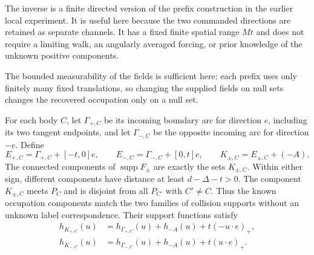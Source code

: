 The inverse is a finite directed version of the prefix construction
in the earlier local experiment.  It is useful here because the
two commanded directions are retained as separate channels.
It has a fixed finite spatial range $Mt$ and does not require a
limiting walk, an angularly averaged forcing, or prior knowledge of
the unknown positive components.

The bounded measurability of the fields is sufficient here: each
prefix uses only finitely many fixed translations, so changing
the supplied fields on null sets changes the recovered occupation
only on a null set.

\begin{lemma}
\label{lem:two-field-supports}
For each body $C$, let $\Gamma_{+,C}$ be its incoming boundary arc
for direction $e$, including its two tangent endpoints, and let
$\Gamma_{-,C}$ be the opposite incoming arc for direction $-e$.
Define
\begin{equation}\label{eq:two-field-strips}
 E_{+,C}=\Gamma_{+,C}+[-t,0]e,\qquad
 E_{-,C}=\Gamma_{-,C}+[0,t]e,
 \qquad K_{\pm,C}=E_{\pm,C}+(-A).
\end{equation}
The connected components of $\operatorname{supp}F_\pm$ are exactly
the sets $K_{\pm,C}$.  Within either sign, different components
have distance at least $d-\Delta-t>0$.
The component $K_{\pm,C}$ meets $P_C$ and is disjoint from all
$P_{C'}$ with $C'\ne C$.  Thus the known occupation components
match the two families of collision supports without an unknown
label correspondence.  Their support functions satisfy
\begin{align}
 h_{K_{+,C}}(u)
   &=h_{\Gamma_{+,C}}(u)+h_{-A}(u)+t(-u\cdot e)_+,
       \label{eq:two-field-plus-support}\\
 h_{K_{-,C}}(u)
   &=h_{\Gamma_{-,C}}(u)+h_{-A}(u)+t(u\cdot e)_+.
       \label{eq:two-field-minus-support}
\end{align}
\end{lemma}
